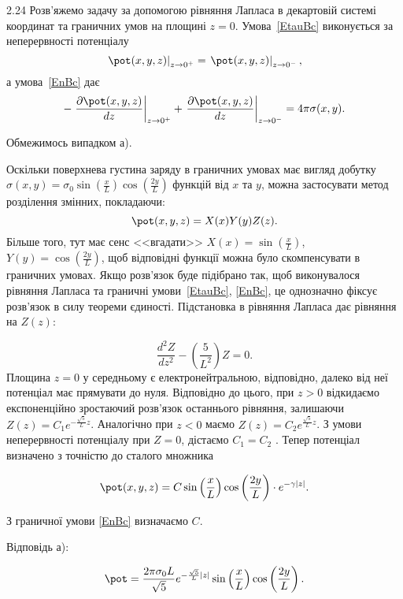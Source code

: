 \begin{Solution}{2.{24}}
    Розв'яжемо задачу за допомогою рівняння Лапласа в декартовій системі координат  та граничних умов на площині $z = 0$. Умова~\eqref{EtauBc} виконується за неперервності потенціалу
	\begin{equation*}\label{continuity}
		\left.\pot(x,y,z)\right|_{z \to 0^+} = \left.\pot(x,y,z)\right|_{z \to 0^-},
	\end{equation*}
	а умова~\eqref{EnBc} дає
	\begin{equation*}\label{boundary}
		-\left. \frac{\partial \pot(x,y,z)}{dz}\right|_{z \to 0^+} + \left. \frac{\partial \pot(x,y,z)}{dz}\right|_{z \to 0^-} =4\pi\sigma(x,y).
	\end{equation*}

	Обмежимось випадком а).

	Оскільки поверхнева густина заряду в граничних умовах має вигляд добутку $\sigma(x, y) = \sigma_0 \sin\left( \frac{x}{L}\right) \cos\left( \frac{2y}{L}\right) $ функцій від $x$ та $y$, можна застосувати метод розділення змінних, покладаючи:
    \[
        \pot(x,y,z) = X(x)Y(y)Z(z).
    \]
Більше того, тут має сенс <<вгадати>> $X(x) = \sin\left(\frac{x}{L}\right) $, $Y(y) = \cos\left(\frac{2y}{L}\right) $, щоб відповідні функції можна було скомпенсувати в граничних умовах. Якщо розв’язок буде підібрано так, щоб виконувалося рівняння Лапласа та граничні умови~\eqref{EtauBc}, \eqref{EnBc}, це однозначно фіксує розв'язок в силу теореми єдиності. Підстановка в рівняння Лапласа дає рівняння на $Z(z)$:

\begin{equation*}
    \frac{d^2Z}{dz^2} - \left( \frac{5}{L^2}\right) Z = 0.
\end{equation*}
Площина  $z = 0$ у середньому є електронейтральною, відповідно, далеко від неї потенціал має прямувати до нуля. Відповідно до цього, при $z >0$  відкидаємо експоненційно зростаючий розв’язок останнього рівняння, залишаючи $ Z(z) = C_1  e^{-\frac{\sqrt5}{L}z} $. Аналогічно при $z < 0$  маємо $ Z(z) = C_2  e^{\frac{\sqrt5}{L}z} $. З умови неперервності потенціалу при $Z = 0$, дістаємо $C_1 = C_2$ . Тепер потенціал визначено з точністю до сталого множника


	\begin{equation*}
		\pot (x,y,z) = C \sin\left( \frac{x}{L} \right)   \cos\left( \frac{2y}{L} \right)  \cdot e^{-\gamma |z|}.
	\end{equation*}

З граничної умови \eqref{EnBc} визначаємо $C$.

Відповідь а):

	\begin{equation*}
		\pot = \frac{2\pi\sigma_0 L}{\sqrt{5}}e^{-\frac{\sqrt{5}}{L}|z|}\sin\left( \frac{x}{L}\right) \cos\left( \frac{2y}{L}\right) .
	\end{equation*}
\end{Solution}
